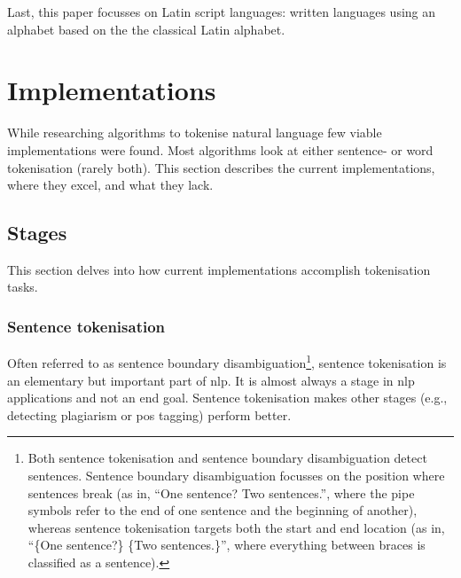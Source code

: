 Last, this paper focusses on Latin script languages: written languages
  using an alphabet based on the the classical Latin alphabet.

\section{Implementations}\label{implementations}

While researching algorithms to tokenise natural language few viable
  implementations were found.
Most algorithms look at either sentence- or word tokenisation (rarely both).
This section describes the current implementations, where they excel, and
  what they lack.

\subsection{Stages}\label{stages}

This section delves into how current implementations accomplish
  tokenisation tasks.

\subsubsection{Sentence tokenisation}\label{sentence-tokenisation}

Often referred to as sentence boundary disambiguation\footnote{Both
    sentence tokenisation and sentence boundary disambiguation detect
      sentences.
    Sentence boundary disambiguation focusses on the position where
      sentences break (as in, ``One sentence?\textbar{} Two
      sentences.\textbar{}'', where the pipe symbols refer to the end of
      one sentence and the beginning of another), whereas sentence
      tokenisation targets both the start and end location (as in,
      ``\{One sentence?\} \{Two sentences.\}'', where everything between
      braces is classified as a sentence).}, sentence
  tokenisation is an elementary but important part of \gls{nlp}.
It is almost always a stage in \gls{nlp} applications and not an end goal.
Sentence tokenisation makes other stages (e.g., detecting plagiarism or
  \gls{pos} tagging) perform better.

